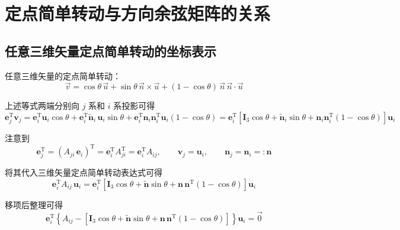 \section{定点简单转动与方向余弦矩阵的关系}

\subsection{任意三维矢量定点简单转动的坐标表示}


任意三维矢量的定点简单转动：
\begin{equation*}
\vec{v} = \cos\theta\, \vec{u} + \sin\theta\, \vec{n} \times \vec{u} + (1 - \cos\theta)\, \vec{n}\, \vec{n} \cdot \vec{u}
\end{equation*}

上述等式两端分别向 $j$ 系和 $i$ 系投影可得
\begin{equation}
\boldsymbol{e}_j^{\mathrm{T}} \boldsymbol{v}_j = \boldsymbol{e}_i^{\mathrm{T}} \boldsymbol{u}_i \cos\theta + \boldsymbol{e}_i^{\mathrm{T}} \tilde{\boldsymbol{n}}_i\, \boldsymbol{u}_i \sin\theta + \boldsymbol{e}_i^{\mathrm{T}} \boldsymbol{n}_i \boldsymbol{n}_i^{\mathrm{T}} \boldsymbol{u}_i (1 - \cos\theta) = \boldsymbol{e}_i^{\mathrm{T}} \left[\boldsymbol{I}_3 \cos\theta + \tilde{\boldsymbol{n}}_i \sin\theta + \boldsymbol{n}_i \boldsymbol{n}_i^{\mathrm{T}} (1 - \cos\theta)\right] \boldsymbol{u}_i
\end{equation}

注意到
\begin{equation}
\boldsymbol{e}_j^{\mathrm{T}} = (A_{ji}\, \boldsymbol{e}_i)^{\mathrm{T}} = \boldsymbol{e}_i^{\mathrm{T}} A_{ji}^{\mathrm{T}} = \boldsymbol{e}_i^{\mathrm{T}} A_{ij}, \qquad \boldsymbol{v}_j = \boldsymbol{u}_i, \qquad \boldsymbol{n}_j = \boldsymbol{n}_i =: \boldsymbol{n}
\end{equation}

将其代入三维矢量定点简单转动表达式可得
\begin{equation}
\boldsymbol{e}_i^{\mathrm{T}} A_{ij}\, \boldsymbol{u}_i = \boldsymbol{e}_i^{\mathrm{T}} \left[\boldsymbol{I}_3 \cos\theta + \tilde{\boldsymbol{n}} \sin\theta + \boldsymbol{n}\, \boldsymbol{n}^{\mathrm{T}} (1 - \cos\theta)\right] \boldsymbol{u}_i
\end{equation}

移项后整理可得
\begin{equation}
\boldsymbol{e}_i^{\mathrm{T}} \left\{A_{ij} - \left[\boldsymbol{I}_3 \cos\theta + \tilde{\boldsymbol{n}} \sin\theta + \boldsymbol{n}\, \boldsymbol{n}^{\mathrm{T}} (1 - \cos\theta)\right]\right\} \boldsymbol{u}_i = \vec{0}
\end{equation}

